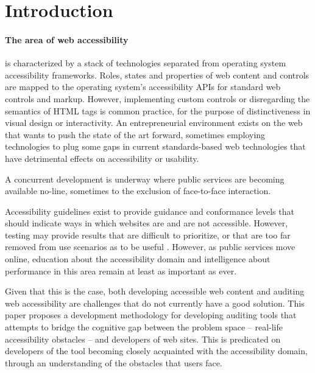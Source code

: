 \section{Introduction} %
\label{sec:introduction}

\paragraph{The area of web accessibility} %
 \label{par:the_area_of_web_accessibility}
 is characterized by a stack of technologies separated from operating system accessibility frameworks. Roles, states and properties of web content and controls are mapped to the operating system's accessibility APIs for standard web controls and markup. 
 However, implementing custom controls or disregarding the semantics of HTML tags is common practice, for the purpose of distinctiveness in visual design or interactivity. An entrepreneurial environment exists on the web that wants to push the state of the art forward, sometimes employing technologies to plug some gaps in current standards-based web technologies that have detrimental effects on accessibility or usability.

A concurrent development is underway where public services are becoming available no-line, sometimes to the exclusion of face-to-face interaction. 

Accessibility guidelines exist to provide guidance and conformance levels that should indicate ways in which websites are and are not accessible. However, testing may provide results that are difficult to prioritize, or that are too far removed from use scenarios as to be useful \cite{Connor:2010,Brajnik:2006}. However, as public services move online, education about the accessibility domain and intelligence about performance in this area remain at least as important as ever.

Given that this is the case, both developing accessible web content and auditing web accessibility are challenges that do not currently have a good solution. 
This paper proposes a development methodology for developing auditing tools that attempts to bridge the cognitive gap between the problem space -- real-life accessibility obstacles -- and developers of web sites. This is predicated on developers of the tool becoming closely acquainted with the accessibility domain, through an understanding of the obstacles that users face. \\


